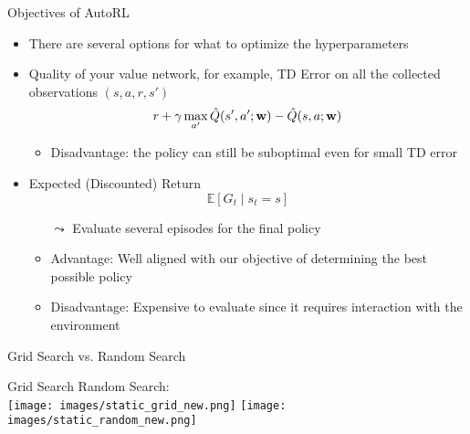 \documentclass[aspectratio=169]{../latex_main/tntbeamer}  %
\begin{document}
\begin{frame}[c]{Objectives of AutoRL}

	\begin{itemize}
            \item There are several options for what to optimize the hyperparameters
            \item Quality of your value network, for example, TD Error on all the collected observations $(s, a, r, s')$ 
               $$ r + \gamma \max_{a'} \hat{Q}(s',a';\mathbf{w}) - \hat{Q}(s,a;\mathbf{w})$$
            \begin{itemize}
                \item Disadvantage: the policy can still be suboptimal even for small TD error
            \end{itemize}
            \smallskip
            \pause
            \item Expected (Discounted) Return
            $$\mathbb{E}[G_t \mid s_t=s]$$
            \begin{itemize}
                \item[$\leadsto$] Evaluate several episodes for the final policy
                \item Advantage: Well aligned with our objective of determining the best possible policy
                \item Disadvantage: Expensive to evaluate since it requires interaction with the environment
            \end{itemize}
        \end{itemize}
	
\end{frame}
\begin{frame}[c]{Grid Search vs. Random Search}
	
\centering
Grid Search \hspace{10em} Random Search:\\
\texttt{[image: images/static\_grid\_new.png]}
\texttt{[image: images/static\_random\_new.png]}

\end{frame}
\end{document}
